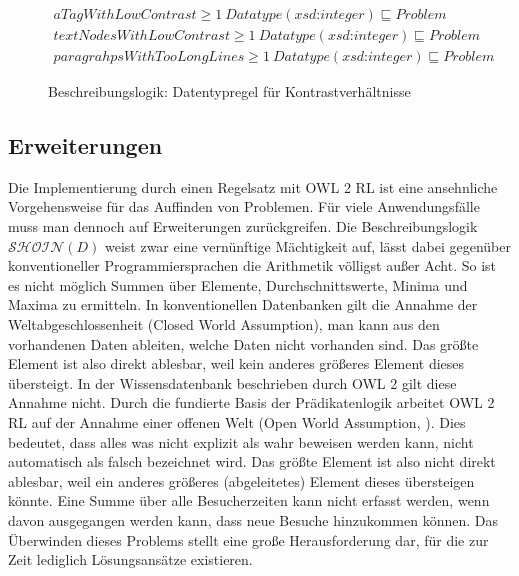 \documentclass[runningheads,a4paper]{llncs}
\begin{document}
\begin{figure}
\begin{equation}
\begin{aligned}
aTagWithLowContrast \geq 1\ Datatype(\textit{xsd:integer}) \sqsubseteq Problem \\
textNodesWithLowContrast \geq 1\ Datatype(\textit{xsd:integer}) \sqsubseteq Problem \\
paragrahpsWithTooLongLines \geq 1\ Datatype(\textit{xsd:integer}) \sqsubseteq Problem
\label{eq:dl_datatype2}
\end{aligned}
\end{equation}
\caption{Beschreibungslogik: Datentypregel für Kontrastverhältnisse}
\end{figure}



\subsection{Erweiterungen}
\label{sec:rule_extensions}

Die Implementierung durch einen Regelsatz mit OWL 2 RL \cite{owl2rl} ist eine ansehnliche Vorgehensweise für das Auffinden von Problemen. 
Für viele Anwendungsfälle muss man dennoch auf Erweiterungen zurückgreifen. 
Die Beschreibungslogik \(\mathcal{SHOIN}(D)\) weist zwar eine vernünftige Mächtigkeit auf, lässt dabei gegenüber konventioneller Programmiersprachen die Arithmetik völligst außer Acht. 
So ist es nicht möglich Summen über Elemente, Durchschnittswerte, Minima und Maxima zu ermitteln. 
In konventionellen Datenbanken gilt die Annahme der Weltabgeschlossenheit (Closed World Assumption), man kann aus den vorhandenen Daten ableiten, welche Daten nicht vorhanden sind. 
Das größte Element ist also direkt ablesbar, weil kein anderes größeres Element dieses übersteigt. 
In der Wissensdatenbank beschrieben durch OWL 2 gilt diese Annahme nicht. 
Durch die fundierte Basis der Prädikatenlogik arbeitet OWL 2 RL auf der Annahme einer offenen Welt (Open World Assumption, \cite[p. 194]{foundations}). 
Dies bedeutet, dass alles was nicht explizit als wahr beweisen werden kann, nicht automatisch als falsch bezeichnet wird. 
Das größte Element ist also nicht direkt ablesbar, weil ein anderes größeres (abgeleitetes) Element dieses übersteigen könnte. 
Eine Summe über alle Besucherzeiten kann nicht erfasst werden, wenn davon ausgegangen werden kann, dass neue Besuche hinzukommen können.
Das Überwinden dieses Problems stellt eine große Herausforderung dar, für die zur Zeit lediglich Lösungsansätze existieren. 
\end{document}
